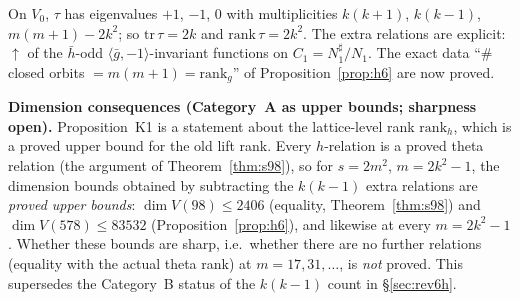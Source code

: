 \begin{corollary}[\src{37}, \S1]\label{cor:K1}
On $V_0$, $\tau$ has eigenvalues $+1$, $-1$, $0$ with multiplicities $k(k+1)$, $k(k-1)$, $m(m+1)-2k^2$; so $\mathrm{tr}\,\tau=2k$ and $\mathrm{rank}\,\tau=2k^2$. The extra relations are explicit: $\uparrow$ of the $\bar h$-odd $\langle\bar g,-1\rangle$-invariant functions on $C_1=N_1^\sharp/N_1$. The exact data ``$\#$closed orbits $=m(m+1)=\mathrm{rank}_g$'' of Proposition~\ref{prop:h6} are now proved.
\end{corollary}
\noindent\textbf{Dimension consequences (Category~A as upper bounds; sharpness open).} Proposition~K1 is a statement about the lattice-level rank $\mathrm{rank}_h$, which is a proved upper bound for the old lift rank. Every $h$-relation is a proved theta relation (the argument of Theorem~\ref{thm:s98}), so for $s=2m^2$, $m=2k^2-1$, the dimension bounds obtained by subtracting the $k(k-1)$ extra relations are \emph{proved upper bounds}: $\dim V(98)\le2406$ (equality, Theorem~\ref{thm:s98}) and $\dim V(578)\le83532$ (Proposition~\ref{prop:h6}), and likewise at every $m=2k^2-1$. Whether these bounds are sharp, i.e.\ whether there are no further relations (equality with the actual theta rank) at $m=17,31,\dots$, is \emph{not} proved. This supersedes the Category~B status of the $k(k-1)$ count in \S\ref{sec:rev6h}.

